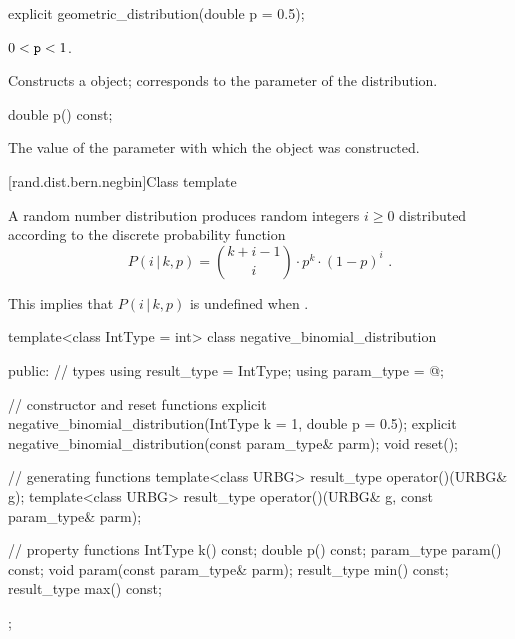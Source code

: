 %
\begin{itemdecl}
explicit geometric_distribution(double p = 0.5);
\end{itemdecl}

\begin{itemdescr}
\pnum\requires
 $0 < \texttt{p} < 1$.

\pnum\effects Constructs a  object;
 corresponds to the parameter of the distribution.
\end{itemdescr}

%
\begin{itemdecl}
double p() const;
\end{itemdecl}

\begin{itemdescr}
\pnum\returns The value of the  parameter
 with which the object was constructed.
\end{itemdescr}


[rand.dist.bern.negbin]{Class template }
%
%

\pnum
A  random number distribution
produces random integers $i \geq 0$
distributed according to
the discrete probability function
%
%
\[ P(i\,|\,k,p) = \binom{k+i-1}{i} \cdot p^k \cdot (1-p)^i \text{ .} \]
\begin{note}
This implies that $P(i\,|\,k,p)$ is undefined when .
\end{note}

%
\begin{codeblock}
template<class IntType = int>
  class negative_binomial_distribution {
  public:
    // types
    using result_type = IntType;
    using param_type  = @\unspec@;

    // constructor and reset functions
    explicit negative_binomial_distribution(IntType k = 1, double p = 0.5);
    explicit negative_binomial_distribution(const param_type& parm);
    void reset();

    // generating functions
    template<class URBG>
      result_type operator()(URBG& g);
    template<class URBG>
      result_type operator()(URBG& g, const param_type& parm);

    // property functions
    IntType k() const;
    double p() const;
    param_type param() const;
    void param(const param_type& parm);
    result_type min() const;
    result_type max() const;
  };
\end{codeblock}


